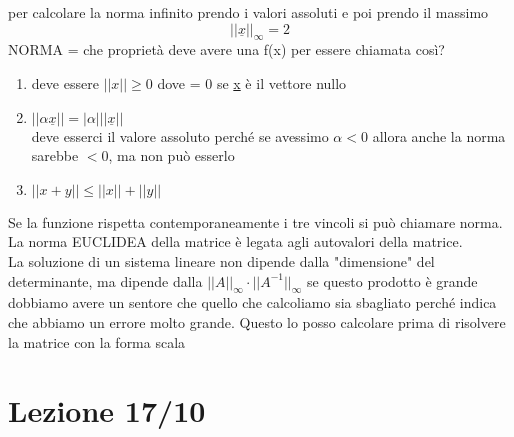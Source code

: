\documentclass[a4paper, portrait]{book}
\numberwithin{equation}{chapter} %
\begin{document}
per calcolare la norma infinito prendo i valori assoluti e poi prendo il massimo
\begin{equation}
    ||\underline{x}||_\infty = 2
\end{equation}
NORMA = che proprietà deve avere una f(x) per essere chiamata così?
\begin{enumerate}
    \item deve essere $||x|| \geq 0$ dove = 0 se \underline{x} è il vettore nullo
    \item $||\alpha \underline{x}|| = |\alpha| ||\underline{x}||$
    \\deve esserci il valore assoluto perché se avessimo $\alpha < 0$ allora anche la norma sarebbe $<0$, ma non può esserlo
    \item $||x+y|| \leq ||x|| + ||y||$
\end{enumerate}
Se la funzione rispetta contemporaneamente i tre vincoli si può chiamare norma.\\
La norma EUCLIDEA della matrice è legata agli autovalori della matrice.\\
La soluzione di un sistema lineare non dipende dalla "dimensione" del determinante, ma dipende dalla $||A||_\infty \cdot ||A^{-1}||_\infty$ se questo prodotto è grande dobbiamo avere un sentore che quello che calcoliamo sia sbagliato perché indica che abbiamo un errore molto grande. Questo lo posso calcolare prima di risolvere la matrice con la forma scala
\chapter{Lezione 17/10}
\end{document}
